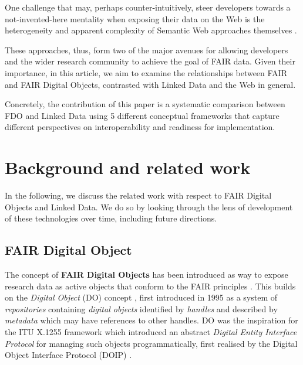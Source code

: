 \documentclass[fleqn,10pt,NOlineno]{wlpeerjlua}
\begin{document}
One challenge that may, perhaps counter-intuitively, steer developers towards a not-invented-here mentality \autocite{stefiDevelopersMakeUnbiased2015,stefiDevelopReuseTwo2015a} when exposing their data on the Web is the heterogeneity and apparent complexity of Semantic Web approaches themselves \autocite{merono-penuelaWebDataApis2021b}.

These approaches, thus, form two of the major avenues for allowing developers and the wider research community to achieve the goal of FAIR data. Given their importance, in this article, we aim to examine the relationships between FAIR and FAIR Digital Objects, contrasted with Linked Data and the Web in general.

Concretely, the contribution of this paper is a systematic comparison between FDO and Linked Data using 5 different conceptual frameworks that capture different perspectives on interoperability and readiness for implementation.

\section*{Background and related work}\label{sec:background}

In the following, we discuss the related work with respect to FAIR Digital Objects and Linked Data. We do so by looking through the lens of development of these technologies over time, including future directions.

\subsection*{FAIR Digital Object}\label{sec:fdo}

The concept of \textbf{FAIR Digital Objects} \autocite{schultesFAIRPrinciplesDigital2019a} has been introduced as way to expose research data as active objects that conform to the FAIR principles \autocite{wilkinsonFAIRGuidingPrinciples2016e}. This builds on the \emph{Digital Object} (DO) concept \autocite{kahnFrameworkDistributedDigital2006b}, first introduced in 1995 \autocite{kahnFrameworkDistributedDigital1995a} as a system of \emph{repositories} containing \emph{digital objects} identified by \emph{handles} and described by \emph{metadata} which may have references to other handles. DO was the inspiration for the ITU X.1255 framework \autocite{x1255FrameworkDiscovery} which introduced an abstract \emph{Digital Entity Interface Protocol} for managing such objects programmatically, first realised by the Digital Object Interface Protocol (DOIP) \autocite{DigitalObjectInterface}.
\end{document}
